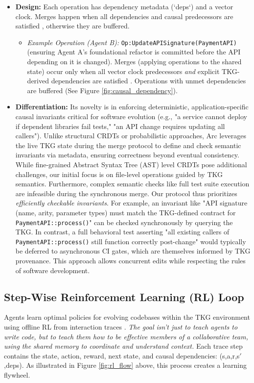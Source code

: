 \documentclass{article}
\begin{document}
\begin{itemize}
  \item \textbf{Design:} Each operation has dependency metadata (`deps`) and a vector clock. Merges happen when all dependencies and causal predecessors are satisfied \cite{ref5,ref14,ref15,ref24}, otherwise they are buffered.
      \begin{itemize}
          \item \textit{Example Operation (Agent B):} \verb|Op:UpdateAPISignature(PaymentAPI)| (ensuring Agent A's foundational refactor is committed before the API depending on it is changed). Merges (applying operations to the shared state) occur only when all vector clock predecessors \textit{and} explicit TKG-derived dependencies are satisfied \cite{ref9, ref20, ref21, ref22}. Operations with unmet dependencies are buffered (See Figure \ref{fig:causal_dependency}).
      \end{itemize}

  \item \textbf{Differentiation:} Its novelty is in enforcing deterministic, application-specific causal invariants critical for software evolution (e.g., "a service cannot deploy if dependent libraries fail tests," "an API change requires updating all callers"). Unlike structural CRDTs or probabilistic approaches, Arc leverages the live TKG state during the merge protocol to define and check semantic invariants via metadata, ensuring correctness beyond eventual consistency.
While fine-grained Abstract Syntax Tree (AST) level CRDTs pose additional challenges, our initial focus is on file-level operations guided by TKG semantics. Furthermore, complex semantic checks like full test suite execution are infeasible during the synchronous merge. Our protocol thus prioritizes \textit{efficiently checkable invariants}. For example, an invariant like "API signature (name, arity, parameter types) must match the TKG-defined contract for \verb|PaymentAPI::process()|" can be checked synchronously by querying the TKG. In contrast, a full behavioral test asserting "all existing callers of \verb|PaymentAPI::process()| still function correctly post-change" would typically be deferred to asynchronous CI gates, which are themselves informed by TKG provenance. This approach allows concurrent edits while respecting the rules of software development.
\end{itemize}

\subsection{Step-Wise Reinforcement Learning (RL) Loop}
Agents learn optimal policies for evolving codebases within the TKG environment using offline RL from interaction traces \cite{ref12, ref19}. \textit{The goal isn't just to teach agents to write code, but to teach them how to be effective members of a collaborative team, using the shared memory to coordinate and understand context.} Each trace step contains the state, action, reward, next state, and causal dependencies: (s,a,r,s$'$,deps). As illustrated in Figure \ref{fig:rl_flow} above, this process creates a learning flywheel.
\end{document}
